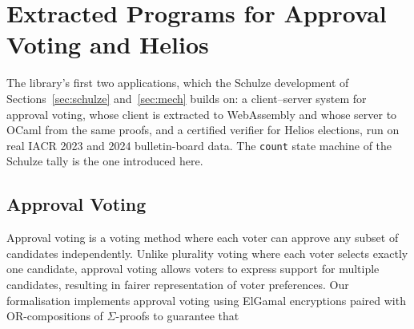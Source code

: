 \section{Extracted Programs for Approval Voting and Helios}\label{app:programs}
The library's first two applications, which the Schulze development of Sections~\ref{sec:schulze} and~\ref{sec:mech} builds on: a client--server system for approval voting, whose client is extracted to WebAssembly and whose server to OCaml from the same proofs, and a certified verifier for Helios elections, run on real IACR 2023 and 2024 bulletin-board data. The \texttt{count} state machine of the Schulze tally is the one introduced here.

\subsection{Approval Voting}
Approval voting is a voting method where each voter can approve any subset of candidates independently. 
Unlike plurality voting where each voter selects exactly one candidate, approval voting allows voters to express 
support for multiple candidates, resulting in fairer representation of voter preferences. Our formalisation 
implements approval voting using ElGamal encryptions paired with OR-compositions of $\Sigma$-proofs to guarantee that 
